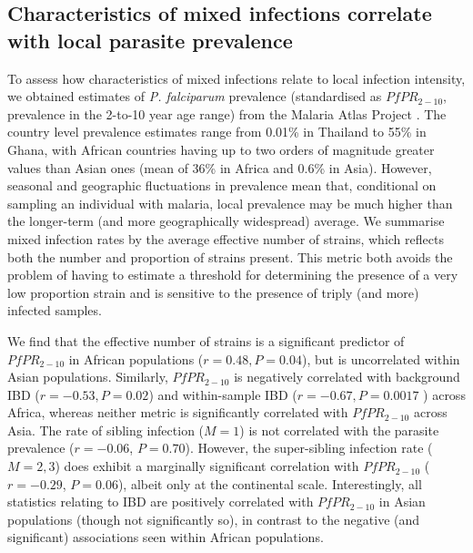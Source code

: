 \documentclass[9pt,lineno]{elife}
\begin{document}
\subsection{Characteristics of mixed infections correlate with local parasite prevalence}

To assess how characteristics of mixed infections relate to local infection intensity, we obtained estimates of {\it P. falciparum} prevalence (standardised as $PfPR_{2-10}$, prevalence in the 2-to-10 year age range) from the Malaria Atlas Project \citep[see Table~\ref{tab:Pf3k}]{MAP2017}. The country level prevalence estimates range from 0.01\% in Thailand to 55\% in Ghana, with African countries having up to two orders of magnitude greater values than Asian ones (mean of 36\% in Africa and 0.6\% in Asia). However, seasonal and geographic fluctuations in prevalence mean that, conditional on sampling an individual with malaria, local prevalence may be much higher than the longer-term (and more geographically widespread) average. We summarise mixed infection rates by the average effective number of strains, which reflects both the number and proportion of strains present.  This metric both avoids the problem of having to estimate a threshold for determining the presence of a very low proportion strain and is sensitive to the presence of triply (and more) infected samples.

We find that the effective number of strains is a significant predictor of $PfPR_{2-10}$ in African populations ($r=0.48, P=0.04$), but is uncorrelated within Asian populations. Similarly, $PfPR_{2-10}$ is negatively correlated with background IBD ($r = -0.53, P=0.02$) and within-sample IBD ($r= -0.67, P=0.0017$ ) across Africa, whereas neither metric is significantly correlated with $PfPR_{2-10}$ across Asia.  The rate of sibling infection ($M=1$) is not correlated with the parasite prevalence ($r=-0.06$, $P=0.70$). However, the super-sibling infection rate ($M=2, 3$) does exhibit a marginally significant correlation with $PfPR_{2-10}$ ($r=-0.29$, $P=0.06$), albeit only at the continental scale.  Interestingly, all statistics relating to IBD are positively correlated with $PfPR_{2-10}$ in Asian populations (though not significantly so), in contrast to the negative (and significant) associations seen within African populations.
\end{document}
